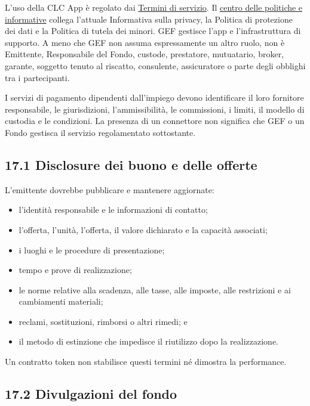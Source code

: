 \documentclass[11pt]{article}
\begin{document}
L'uso della CLC App è regolato dai \href{https://docs.cosmolocal.credit/it/governance/terms}{Termini di servizio}. Il \href{https://docs.cosmolocal.credit/it/governance/policies}{centro delle politiche e informative} collega l'attuale Informativa sulla privacy, la Politica di protezione dei dati e la Politica di tutela dei minori. GEF gestisce l'app e l'infrastruttura di supporto. A meno che GEF non assuma espressamente un altro ruolo, non è Emittente, Responsabile del Fondo, custode, prestatore, mutuatario, broker, garante, soggetto tenuto al riscatto, consulente, assicuratore o parte degli obblighi tra i partecipanti.

I servizi di pagamento dipendenti dall'impiego devono identificare il loro fornitore responsabile, le giurisdizioni, l'ammissibilità, le commissioni, i limiti, il modello di custodia e le condizioni. La presenza di un connettore non significa che GEF o un Fondo gestisca il servizio regolamentato sottostante.

\subsection*{17.1 Disclosure dei buono e delle offerte}

L'emittente dovrebbe pubblicare e mantenere aggiornate:

\begin{itemize}[leftmargin=*]
\item l'identità responsabile e le informazioni di contatto;
\item l'offerta, l'unità, l'offerta, il valore dichiarato e la capacità associati;
\item i luoghi e le procedure di presentazione;
\item tempo e prove di realizzazione;
\item le norme relative alla scadenza, alle tasse, alle imposte, alle restrizioni e ai cambiamenti materiali;
\item reclami, sostituzioni, rimborsi o altri rimedi; e
\item il metodo di estinzione che impedisce il riutilizzo dopo la realizzazione.
\end{itemize}
Un contratto token non stabilisce questi termini né dimostra la performance.

\subsection*{17.2 Divulgazioni del fondo}
\end{document}
